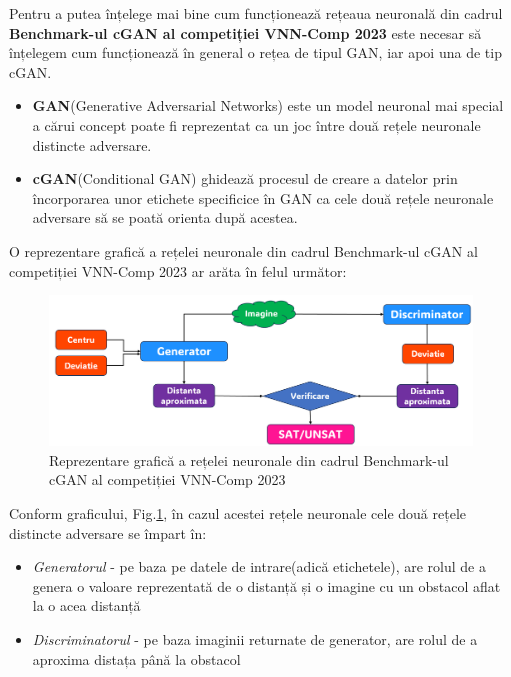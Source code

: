 \hspace{0.5 cm}
Pentru a putea înțelege mai bine cum funcționează rețeaua neuronală din cadrul \textbf{Benchmark-ul cGAN al competiției VNN-Comp 2023} este necesar să înțelegem cum funcționează în general o rețea de tipul GAN, iar apoi una de tip cGAN.
\begin{itemize}
    \item \textbf{GAN}(Generative Adversarial Networks) este un model neuronal mai special \cite{GAN} a cărui concept poate fi reprezentat ca un joc între două rețele neuronale distincte adversare.

    \item \textbf{cGAN}(Conditional GAN) \cite{CGAN} ghidează procesul de creare a datelor prin încorporarea unor etichete specificice în GAN ca cele două rețele neuronale adversare să se poată orienta după acestea.
\newline
\end{itemize}

O reprezentare grafică a rețelei neuronale din cadrul Benchmark-ul cGAN al competiției VNN-Comp 2023 ar arăta în felul următor:


\begin{figure}[ht]
\centering
\includegraphics[width=12cm]{imagini/introducere/Ale_1.png}
\caption{Reprezentare grafică a rețelei neuronale din cadrul Benchmark-ul cGAN al competiției VNN-Comp 2023}
\label{reprezentare_grafica_cGAN}
\end{figure}

Conform graficului, Fig.\ref{reprezentare_grafica_cGAN}, în cazul acestei rețele neuronale cele două rețele distincte adversare se împart în:

\begin{itemize}
  \item \textit{Generatorul} - pe baza pe datele de intrare(adică etichetele), are rolul de a genera o valoare reprezentată de o distanță și o imagine cu un obstacol aflat la o acea distanță
  
  \item \textit{Discriminatorul} - pe baza imaginii returnate de generator, are rolul de a aproxima distața până la obstacol
\end{itemize}
\newpage

